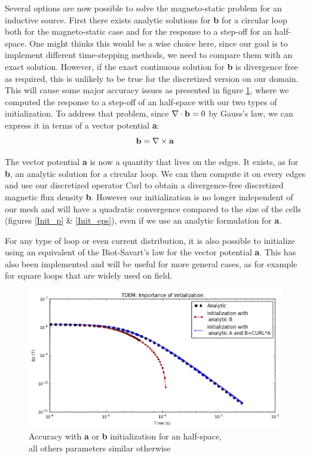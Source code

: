 \documentclass[twoside]{article}
\begin{document}
Several options are now possible to solve the magneto-static problem for an inductive source. First there exists analytic solutions for \textbf{b} for a circular loop both for the magneto-static case and for the response to a step-off for an half-space. One might thinks this would be a wise choice here, since our goal is to implement different time-stepping methods, we need to compare them with an exact solution. However, if the exact continuous solution for \textbf{b} is divergence free as required, this is unlikely to be true for the discretized version on our domain. This will cause some major accuracy issues as presented in figure \ref{Convergence_Initialisation}, where we computed the response to a step-off of an half-space with our two types of initialization. To address that problem, since $\nabla \cdot {\bf b}=0$ by Gauss's law, we can express it in terms of a vector potential \textbf{a}:
\begin{equation}
{\bf b}= \nabla \times {\bf a}
\end{equation} 

The vector potential \textbf{a} is now a quantity that lives on the edges. It exists, as for \textbf{b}, an analytic solution for a circular loop. We can then compute it on every edges and use our discretized operator Curl to obtain a divergence-free discretized magnetic flux density \textbf{b}. However our initialization is no longer independent of our mesh and will have a quadratic convergence compared to the size of the cells (figures \ref{Init_p} \& \ref{Init_eps}), even if we use an analytic formulation for \textbf{a}.

For any type of loop or even current distribution, it is also possible to initialize using an equivalent of the Biot-Savart's law for the vector potential \textbf{a}. This has also been implemented and will be useful for more general cases, as for example for square loops that are widely used on field.


\begin{figure}[!ht]
\centering
\includegraphics[scale=0.4]{./figures/initialisation/Initialization.png}
\caption{Accuracy with \textbf{a} or \textbf{b} initialization for an half-space,\\ all others parameters similar otherwise}
\label{Convergence_Initialisation}
\end{figure}
\end{document}
